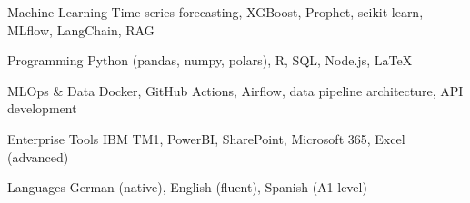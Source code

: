 

\begin{cvskills}

  \cvskill
    {Machine Learning} %
    {Time series forecasting, XGBoost, Prophet, scikit-learn, MLflow, LangChain, RAG} %

  \cvskill
    {Programming} %
    {Python (pandas, numpy, polars), R, SQL, Node.js, LaTeX} %

  \cvskill
    {MLOps \& Data} %
    {Docker, GitHub Actions, Airflow, data pipeline architecture, API development} %

  \cvskill
    {Enterprise Tools} %
    {IBM TM1, PowerBI, SharePoint, Microsoft 365, Excel (advanced)} %

  \cvskill
    {Languages} %
    {German (native), English (fluent), Spanish (A1 level)} %


\end{cvskills}
